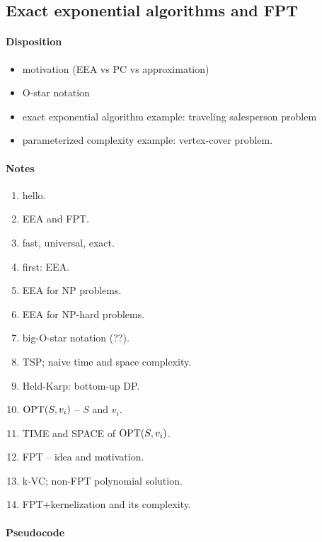 \newpage

\subsection{Exact exponential algorithms and FPT}


\paragraph{Disposition}
\begin{itemize}
\item motivation (EEA vs PC vs approximation)
\item O-star notation
\item exact exponential algorithm example: traveling salesperson problem
\item parameterized complexity example: vertex-cover problem.
\end{itemize}


\paragraph{Notes}

\begin{enumerate}
  \item hello.
  \item EEA and FPT.
  \item fast, universal, exact.\\
  \item first: EEA.
  \item EEA for NP problems.
  \item EEA for NP-hard problems.
  \item big-O-star notation (??).
  \item TSP; naive time and space complexity.
  \item Held-Karp: bottom-up DP.
  \item $\text{OPT}(S, v_i)$ -- $S$ and $v_i$.
  \item TIME and SPACE of $\text{OPT}(S, v_i)$.\\
  \item FPT -- idea and motivation.
  \item k-VC; non-FPT polynomial solution.
  \item FPT+kernelization and its complexity.
\end{enumerate}

\paragraph{Pseudocode}
\label{code:tsp}

